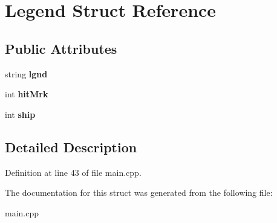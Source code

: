 \hypertarget{struct_legend}{\section{Legend Struct Reference}
\label{struct_legend}
}
\subsection*{Public Attributes}
\begin{DoxyCompactItemize}
\item 
\hypertarget{struct_legend_aec74f6bcc74792152b73b2f20a00d6d3}{string {\bfseries lgnd}}\label{struct_legend_aec74f6bcc74792152b73b2f20a00d6d3}

\item 
\hypertarget{struct_legend_a9a061d9f5e944ca97358214e7c4e0d6b}{int {\bfseries hit\+Mrk}}\label{struct_legend_a9a061d9f5e944ca97358214e7c4e0d6b}

\item 
\hypertarget{struct_legend_a637b6959e10df0779b48fdea71e7999d}{int {\bfseries ship}}\label{struct_legend_a637b6959e10df0779b48fdea71e7999d}

\end{DoxyCompactItemize}


\subsection{Detailed Description}


Definition at line 43 of file main.\+cpp.



The documentation for this struct was generated from the following file\+:\begin{DoxyCompactItemize}
\item 
main.\+cpp\end{DoxyCompactItemize}
